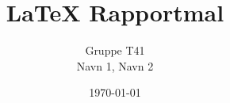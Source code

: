 \documentclass[11pt, a4paper, twocolumn, norsk]{article} %
\begin{document}
\title{LaTeX Rapportmal}
\author{Gruppe T41\\
        Navn 1, Navn 2}
\date{\today}


\maketitle








\printbibliography{}
\label{sec:bibliography}
\end{document}
